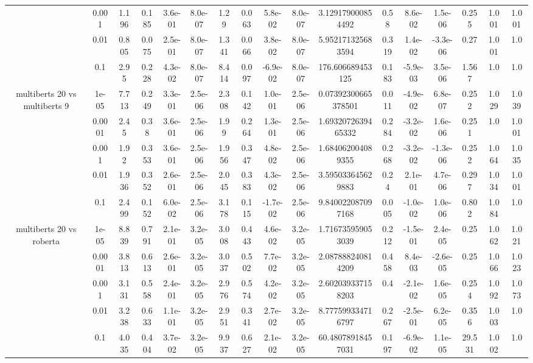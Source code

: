 \begin{tabular}{|c|c|c|c|c|c|c|c|c|c|c|c|c|c|c|c|c|}
 & 0.001 & 1.196 & 0.185 & 3.6e-01 & 8.0e-07 & 1.29 & 0.063 & 5.8e-02 & 8.0e-07 & 3.129179000854492 & 0.58 & 8.6e-02 & 1.5e-06 & 0.255 & 1.001 & 1.001 \\
 & 0.01 & 0.805 & 0.075 & 2.5e-01 & 8.0e-07 & 1.341 & 0.066 & 3.8e-02 & 8.0e-07 & 5.952171325683594 & 0.319 & 1.4e-02 & -3.3e-06 & 0.27 & 1.001 & 1.0 \\
 & 0.1 & 2.95 & 0.228 & 4.3e-02 & 8.0e-07 & 8.414 & 0.097 & -6.9e-02 & 8.0e-07 & 176.606689453125 & 0.183 & -5.9e-03 & 3.5e-06 & 1.567 & 1.0 & 1.0 \\
\hline
\multirow{5}{*}{multiberts 20 vs multiberts 9} & 1e-05 & 7.713 & 0.249 & 3.3e-01 & 2.5e-06 & 2.308 & 0.142 & 1.0e-01 & 2.5e-06 & 0.07392300665378501 & 0.011 & -4.9e-02 & 6.8e-07 & 0.252 & 1.029 & 1.039 \\
 & 0.0001 & 2.45 & 0.38 & 3.6e-01 & 2.5e-06 & 1.99 & 0.264 & 1.3e-01 & 2.5e-06 & 1.6932072639465332 & 0.284 & -3.2e-02 & 1.6e-06 & 0.251 & 1.0 & 1.001 \\
 & 0.001 & 1.92 & 0.353 & 3.6e-01 & 2.5e-06 & 1.956 & 0.347 & 4.8e-02 & 2.5e-06 & 1.684062004089355 & 0.268 & -3.2e-02 & -1.3e-06 & 0.252 & 1.064 & 1.035 \\
 & 0.01 & 1.936 & 0.352 & 2.6e-01 & 2.5e-06 & 2.045 & 0.383 & 4.3e-02 & 2.5e-06 & 3.595033645629883 & 0.24 & 2.1e-01 & 4.7e-06 & 0.297 & 1.034 & 1.001 \\
 & 0.1 & 2.499 & 0.152 & 6.0e-02 & 2.5e-06 & 3.178 & 0.115 & -1.7e-02 & 2.5e-06 & 9.840022087097168 & 0.005 & -1.0e-02 & 1.0e-06 & 0.802 & 1.084 & 1.0 \\
\hline
\multirow{5}{*}{multiberts 20 vs roberta } & 1e-05 & 8.839 & 0.791 & 2.1e-01 & 3.2e-05 & 3.008 & 0.443 & 4.6e-02 & 3.2e-05 & 1.716735959053039 & 0.212 & -1.5e-01 & 2.4e-05 & 0.25 & 1.062 & 1.021 \\
 & 0.0001 & 3.813 & 0.613 & 2.6e-01 & 3.2e-05 & 3.037 & 0.502 & 7.7e-02 & 3.2e-05 & 2.087888240814209 & 0.458 & 8.4e-03 & -2.6e-05 & 0.25 & 1.066 & 1.023 \\
 & 0.001 & 3.131 & 0.558 & 2.4e-01 & 3.2e-05 & 2.976 & 0.574 & 4.2e-02 & 3.2e-05 & 2.602039337158203 & 0.4 & -2.1e-02 & 1.6e-05 & 0.254 & 1.092 & 1.073 \\
 & 0.01 & 3.238 & 0.633 & 1.1e-01 & 3.2e-05 & 2.951 & 0.341 & 2.7e-02 & 3.2e-05 & 8.777599334716797 & 0.267 & -2.5e-01 & 6.2e-05 & 0.356 & 1.003 & 1.0 \\
 & 0.1 & 4.035 & 0.404 & 3.7e-02 & 3.2e-05 & 9.937 & 0.627 & 2.1e-02 & 3.2e-05 & 60.48078918457031 & 0.197 & -6.9e-02 & 1.1e-05 & 29.531 & 1.002 & 1.0 \\

\end{tabular}
